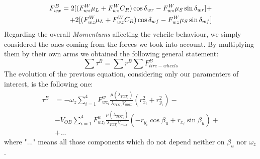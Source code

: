 \documentclass[a4paper,12pt,titlepage]{report}
\numberwithin{figure}{section}
\begin{document}
			\begin{equation} \label{F_{wx}}
			\begin{split}
				F_{wx}^{B} = 2 [(F_{wz}^{W} \mu_{L} + F_{wz}^{W} C_{R})\cos\delta_{wr} - F_{wz}^{W} \mu_{S}\sin\delta_{wr}] + \\ + 2 [(F_{wz}^{W} \mu_{L} + F_{wz}^{W} C_{R})\cos\delta_{wf} - F_{wz}^{W} \mu_{S}\sin\delta_{wf}] 
			\end{split}
			\end{equation}
		Regarding the overall \textit{Momentums} affecting the vehcile behaviour, we simply considered the ones coming from the forces we took into account. By multiplying them by their own arms we obtained the following general statement:
			\begin{equation}
				\sum \tau^{B} = \sum r^{B} \sum F_{tire-wheels}^{B}
			\end{equation}
		The evolution of the previous equation, considering only our paramenters of interest, is the following one:  
			\begin{equation}
				\begin{split}
					\tau^{B} &= -\omega_{z}\sum_{i=1}^{4} F_{wz_{i}}^{w} \frac{\mu(\lambda_{TOT_{i}})}{\lambda_{TOT_{i}} V_{max}} (r_{x_{i}}^{2} + r_{y_{i}}^{2})- \\ &- V_{OB}\sum_{i=1}^{4} F_{wz_{i}}^{w} \frac{\mu(\lambda_{TOT_{i}})}{\lambda_{TOT_{i}} V_{max}} (- r_{y_{i}} \cos \beta_{u} + r_{x_{i}} \sin\beta_{u})+ \\ &+ ... 
				\end{split}	
			\end{equation}
		where "$ ... $" means all those components which do not depend neither on $\beta_{u}$ nor $\omega_{z}$.
\end{document}

